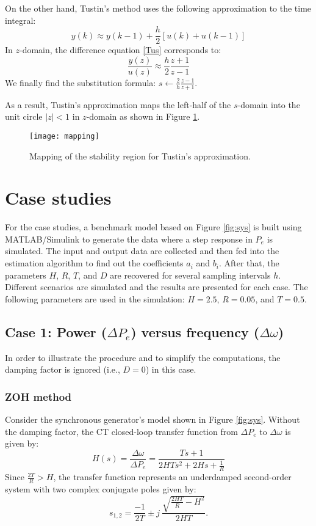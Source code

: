 \documentclass[10pt,journal,final]{IEEEtran}
\begin{document}
On the other hand, Tustin's method uses the following approximation to the time integral:
\begin{equation}\label{Tus}
y(k)\approx y(k-1)+\frac{h}{2}\left[u(k)+u(k-1)\right]
\end{equation}
In $z$-domain, the difference equation \eqref{Tus} corresponds to:
\begin{equation}\label{zee}
\frac{y(z)}{u(z)}\approx \frac{h}{2}\frac{z+1}{z-1}
\end{equation}
We finally find the substitution formula:
$
s \leftarrow\frac{2}{h}\frac{z-1}{z+1}$.


As a result, Tustin's approximation maps the left-half of the $s$-domain into the unit circle $|z| < 1$ in $z$-domain as shown in Figure \ref{fig:map}.
\begin{figure}[h!]
\centering
\texttt{[image: mapping]}
\caption{Mapping of the stability region for Tustin's approximation.} \label{fig:map}
\end{figure}
\section{Case studies}\label{Cases}
For the case studies, a {benchmark} model based on Figure \ref{fig:sys} is built using MATLAB/Simulink to generate the data where a step response in $P_{e}$ is simulated. The input and output data are collected and then fed into the estimation algorithm to find out the coefficients $a_{i}$ and $b_{i}$. After that, the parameters $H$, $R$, $T$, and $D$ are recovered for several sampling intervals $h$. Different scenarios are simulated and the results are presented for each case. The following parameters are used in the simulation: $H=2.5$, $R=0.05$, and $T=0.5$.

\subsection{Case 1: Power ($\Delta P_{e}$) versus {frequency} ($\Delta \omega$)}
In order to illustrate the procedure and to simplify the computations, the damping factor is ignored (i.e., $D=0$) in this case.
\subsubsection{ZOH method}
Consider the synchronous generator's model shown in Figure \ref{fig:sys}. Without the damping factor, the CT closed-loop transfer function from $\Delta P_{e}$ to $\Delta \omega$ is given by:
\begin{equation}\label{Hc}
H(s)=\frac{\Delta \omega}{\Delta P_{e}}=\frac{Ts + 1}{2HT s^2 +2H s + \frac{1}{R}}
\end{equation}
Since $\frac{2T}{R}>H$, the transfer function represents an underdamped second-order system with two complex conjugate poles given by:
\begin{equation}
s_{1,2}=\frac{-1}{2T}\pm j\ \frac{\sqrt{\frac{2HT}{R}-H^{2}}}{2HT}.
\end{equation}
\end{document}
